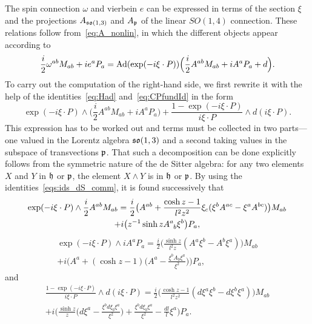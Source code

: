 \documentclass[
final,
11pt,
a4paper,
DIV=11,
headinclude=true,
footinclude=false,
bibliography=totoc,
twoside=true,  %
BCOR=5mm
]{scrbook}
\begin{document}
The spin connection $\omega$ and vierbein $e$ can be expressed in 
terms of the section $\xi$ and the projections $A_{\mathfrak{so}(1,3)}$ 
and $A_\mathfrak{p}$ of the linear $SO(1,4)$ connection. These 
relations follow from~\eqref{eq:A_nonlin}, in which the different 
objects appear according to
\begin{equation*}
  \frac{i}{2} \omega^{ab} M_{ab} + i e^a P_a 
  = \operatorname{Ad}(\exp(-i\xi\cdot P)) \Big( \frac{i}{2} A^{ab} M_{ab} 
  + i A^a P_a + d \Big).
\end{equation*}
To carry out the computation of the right-hand side, we first 
rewrite it with the help of the identities~\eqref{eq:Had} 
and~\eqref{eq:CPfundId} in the form
\begin{equation*}
  \exp(-i\xi\cdot P) \wedge \big( \frac{i}{2} A^{ab} M_{ab} 
  + i A^a P_a \big) + \frac{1 - \exp(-i\xi\cdot P)}{i\xi\cdot P} 
  \wedge d (i\xi\cdot P).
\end{equation*}
This expression has to be worked out and terms must be collected 
in two parts--- one valued in the Lorentz algebra $\mathfrak{so}(1,3)$ 
and a second taking values in the subspace of transvections 
$\mathfrak{p}$.  That such a decomposition can be done 
explicitly follows from the symmetric nature of the de Sitter 
algebra: for any two elements $X$ and $Y$ in $\mathfrak{h}$ or 
$\mathfrak{p}$, the element $X \wedge Y$ is in $\mathfrak{h}$ or $\mathfrak{p}$. By 
using the identities~\eqref{eqs:ids_dS_comm}, it is found 
successively that
\begin{multline*}
  \exp(-i\xi\cdot P) \wedge \frac{i}{2} A^{ab} M_{ab}
  = \frac{i}{2} \big( A^{ab} + \frac{\cosh z - 1}{l^2 z^2} \xi_c 
  ( \xi^b A^{ac} - \xi^a A^{bc} ) \big) M_{ab}
  \\
  + i \big( z^{-1} \sinh z A\ind{^a_b} \xi^b \big) P_a,
\end{multline*}
\begin{multline*}
  \exp(-i\xi\cdot P) \wedge i A^a P_a = \frac{i}{2} \bigg( 
  \frac{\sinh z}{l^2 z} (A^a \xi^b - A^b \xi^a ) \bigg) M_{ab} 
  \\
  + i \bigg( A^a + (\cosh z - 1) \bigg(A^a - \frac{\xi^b 
    A_b \xi^a}{\xi^2}  \bigg) \bigg) P_a,
\end{multline*}
and
\begin{multline*}
  \frac{1 - \exp(-i\xi\cdot P)}{i\xi\cdot P} \wedge d (i\xi\cdot 
  P) = \frac{i}{2} \bigg( \frac{\cosh z - 1}{l^2 z^2} (d\xi^a 
  \xi^b - d\xi^b \xi^a) \bigg) M_{ab}
  \\
  + i \bigg( \frac{\sinh z}{z} \bigg( d\xi^a - \frac{\xi^b 
    d\xi_b \xi^a}{\xi^2} \bigg) + \frac{\xi^b d\xi_b 
    \xi^a}{\xi^2} - \frac{dl}{l} \xi^a \bigg) P_a.
\end{multline*}
\end{document}
